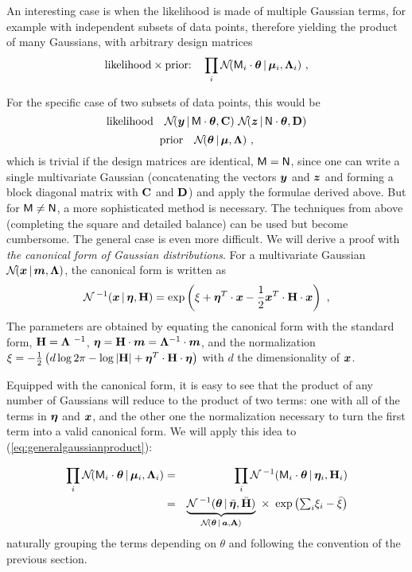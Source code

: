 An interesting case is when the likelihood is made of multiple Gaussian terms, for example with independent subsets of data points, therefore yielding the product of many Gaussians, with arbitrary design matrices
\begin{equation}\label{eq:generalgaussianproduct}
\mbox{likelihood}\times\mbox{prior:} \quad \prod_i \mathcal{N}\!( \mathsf{M}_i\cdot\boldsymbol{\theta} \,|\, \boldsymbol{\mu}_i,\mathbf{\Lambda}_i) 
~ ,
\end{equation}

For the specific case of two subsets of data points, this would be
\begin{equation}
\mbox{likelihood} \quad \normal(\vy\given\mM\cdot\vtheta,\tC) \ \normal(\vz\given\mN\cdot\vtheta,\tD)
\end{equation}
\begin{equation}
\mbox{prior} \quad \mathcal{N}\!(\boldsymbol{\theta}\,|\,\boldsymbol{\mu},\mathbf{\Lambda})
~ ,
\end{equation}
which is trivial if the design matrices are identical, $\mathsf{M} = \mathsf{N}$, since one can write a single multivariate Gaussian (concatenating the vectors $\boldsymbol{y}$ and $\boldsymbol{z}$ and forming a block diagonal matrix with $\mathbf{C}$ and $\mathbf{D}$) and apply the formulae derived above. But for $\mathsf{M} \neq \mathsf{N}$, a more sophisticated method is necessary. The techniques from above (completing the square and detailed balance) can be used but become cumbersome. The general case is even more difficult. We will derive a proof with \textit{the canonical form of Gaussian distributions}. 
For a multivariate Gaussian $\mathcal{N}\!(\boldsymbol{x}\,|\,\boldsymbol{m},\mathbf{\Lambda})$, the canonical form is written as 
\begin{equation}
\normal^{\ -1}(\vx\given\veta, \tH) = \exp\left(\xi +  \veta^T\cdot\vx - \frac{1}{2}\vx^T \cdot\tH \cdot \vx\right)
~ ,
\end{equation}
The parameters are obtained by equating the canonical form with the standard form, $\tH = \tLambda^{\ -1}$, $\boldsymbol{\eta} = \mathbf{H}\cdot \boldsymbol{m} = \mathbf{\Lambda}^{-1}\cdot \boldsymbol{m}$, and the normalization
$\xi = -\frac{1}{2}\left( d\log 2\pi -\log|\mathbf{H}| + \boldsymbol{\eta}^T \cdot \mathbf{H}\cdot \boldsymbol{\eta} \right)$
with $d$ the dimensionality of $\boldsymbol{x}$.

Equipped with the canonical form, it is easy to see that the product of any number of Gaussians will reduce to the product of two terms: one with all of the terms in $\boldsymbol{\eta}$ and $\boldsymbol{x}$, and the other one the normalization necessary to turn the first term into a valid canonical form. We will apply this idea to (\ref{eq:generalgaussianproduct}):

\begin{eqnarray}
\prod_i \normal( \mM_i\cdot\vtheta \given \vmu_i,\tLambda_i) &=& \prod_i \normal^{\ -1}( \mM_i\cdot\vtheta\given\veta_i, \tH_i) \\
&=&   \underbrace{\normal^{\ -1}(\vtheta\given\bar{\veta}, \bar{\tH})}_{ \normal(\vtheta\given\va,\tA) } \ \times \ \exp\left(\textstyle{\sum_i} \xi_i - \bar{\xi} \right)
\end{eqnarray}
naturally grouping the terms depending on $\theta$ and following the convention of the previous section.


